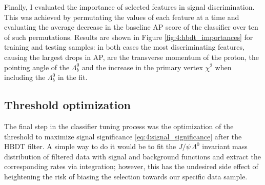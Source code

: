 Finally, I evaluated the importance of selected features in signal discrimination.
This was achieved by permutating the values of each feature at a time and evaluating the average decrease in the baseline AP score of the classifier over ten of such permutations.
Results are shown in Figure \ref{fig:4:hbdt_importances} for training and testing samples:
in both cases the most discriminating features, causing the largest drops in AP, are the transverse momentum of the proton, the pointing angle of the $\Lambda_b^0$ and the increase in the primary vertex $\chi^2$ when including the $\Lambda_b^0$ in the fit.

\subsection{Threshold optimization}
\label{sec:4:threshold_optimization}

The final step in the classifier tuning process was the optimization of the threshold to maximize signal significance \eqref{eq:4:signal_significance} after the HBDT filter.
A simple way to do it would be to fit the $J/\psi\,\Lambda^0$ invariant mass distribution of filtered data with signal and background functions and extract the corresponding rates via integration;
however, this has the undesired side effect of heightening the risk of biasing the selection towards our specific data sample.

